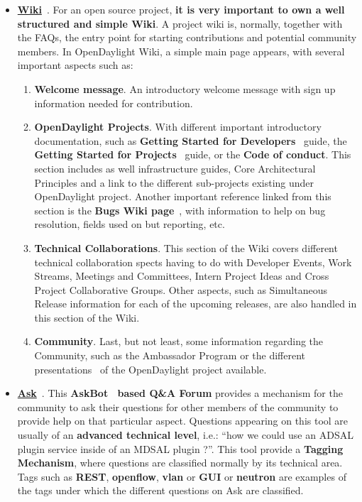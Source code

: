 \documentclass[a4paper, 12pt]{book}
\begin{document}
\begin{itemize}\itemsep0pt
\item{\textbf{\underline{Wiki}}}~\cite{OpenDaylightWiki}. For an open source project, \textbf{it is very important to own a well structured and simple Wiki}. A project wiki is, normally, together with the FAQs, the entry point for starting contributions and potential community members. In OpenDaylight Wiki, a simple main page appears, with several important aspects such as:
\begin{enumerate}\itemsep0pt
\item{\textbf{Welcome message}}. An introductory welcome message with sign up information needed for contribution.
\item{\textbf{OpenDaylight Projects}}. With different important introductory documentation, such as \textbf{Getting Started for Developers}~\cite{OpenDaylightDevStGuide} guide, the \textbf{Getting Started for Projects}~\cite{OpenDaylightProjStGuide} guide, or the \textbf{Code of conduct}. This section includes as well infrastructure guides, Core Architectural Principles and a link to the different sub-projects existing under OpenDaylight project.  Another important reference linked from this section is the \textbf{Bugs Wiki page}~\cite{OpenDaylightBugsWiki}, with information to help on bug resolution, fields used on but reporting, etc.
\item{\textbf{Technical Collaborations}}. This section of the Wiki covers different technical collaboration spects having to do with Developer Events, Work Streams, Meetings and Committees, Intern Project Ideas and Cross Project Collaborative Groups. Other aspects, such as Simultaneous Release information for each of the upcoming releases, are also handled in this section of the Wiki.
\item{\textbf{Community}}. Last, but not least, some information regarding the Community, such as the Ambassador Program or the different presentations~\cite{OpenDaylightPresentations} of the OpenDaylight project available.
\end{enumerate}
\item{\textbf{\underline{Ask}}}~\cite{OpenDaylightAsk}. This \textbf{AskBot~\cite{AskBot} based Q\&A Forum} provides a mechanism for the community to ask their questions for other members of the community to provide help on that particular aspect. Questions appearing on this tool are usually of an \textbf{advanced technical level}, i.e.: ``how we could use an ADSAL plugin service inside of an MDSAL plugin ?''. This tool provide a \textbf{Tagging Mechanism}, where questions are classified normally by its technical area. Tags such as \textbf{REST}, \textbf{openflow}, \textbf{vlan} or \textbf{GUI} or \textbf{neutron} are examples of the tags under which the different questions on Ask are classified.

\end{itemize}
\end{document}
